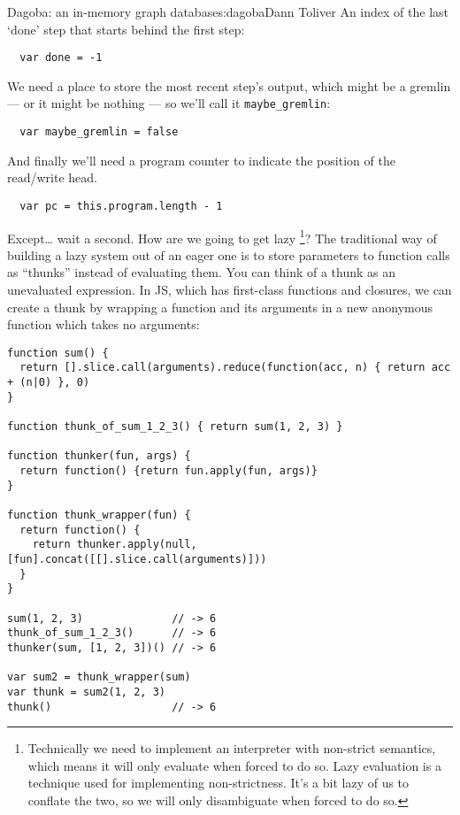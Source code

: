 \begin{aosachapter}{Dagoba: an in-memory graph database}{s:dagoba}{Dann Toliver}
An index of the last `done' step that starts behind the first step:

\begin{verbatim}
  var done = -1
\end{verbatim}

We need a place to store the most recent step's output, which might be a
gremlin --- or it might be nothing --- so we'll call it
\texttt{maybe\_gremlin}:

\begin{verbatim}
  var maybe_gremlin = false
\end{verbatim}

And finally we'll need a program counter to indicate the position of the
read/write head.

\begin{verbatim}
  var pc = this.program.length - 1
\end{verbatim}

Except\ldots{} wait a second. How are we going to get lazy \footnote{Technically
  we need to implement an interpreter with non-strict semantics, which
  means it will only evaluate when forced to do so. Lazy evaluation is a
  technique used for implementing non-strictness. It's a bit lazy of us
  to conflate the two, so we will only disambiguate when forced to do
  so.}? The traditional way of building a lazy system out of an eager
one is to store parameters to function calls as ``thunks'' instead of
evaluating them. You can think of a thunk as an unevaluated expression.
In JS, which has first-class functions and closures, we can create a
thunk by wrapping a function and its arguments in a new anonymous
function which takes no arguments:

\begin{verbatim}
function sum() {
  return [].slice.call(arguments).reduce(function(acc, n) { return acc + (n|0) }, 0)
}

function thunk_of_sum_1_2_3() { return sum(1, 2, 3) }

function thunker(fun, args) {
  return function() {return fun.apply(fun, args)}
}

function thunk_wrapper(fun) {
  return function() {
    return thunker.apply(null, [fun].concat([[].slice.call(arguments)]))
  }
}

sum(1, 2, 3)              // -> 6
thunk_of_sum_1_2_3()      // -> 6
thunker(sum, [1, 2, 3])() // -> 6

var sum2 = thunk_wrapper(sum)
var thunk = sum2(1, 2, 3)
thunk()                   // -> 6
\end{verbatim}


\end{aosachapter}
